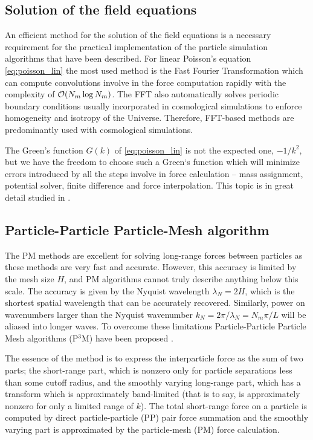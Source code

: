\subsection{Solution of the field equations}
An efficient method for the solution of the field equations is a necessary requirement for the practical implementation of the particle simulation algorithms that have been described. For linear Poisson’s equation \eqref{eq:poisson_lin} the most used method is the Fast Fourier Transformation which can compute convolutions involve in the force computation rapidly with the complexity of $\mathcal{O}(N_m\log N_m)$. The FFT also automatically solves periodic boundary conditions usually incorporated in cosmological simulations to enforce homogeneity and isotropy of the Universe. Therefore, FFT-based methods are predominantly used with cosmological simulations.

The Green's function $G(k)$ of \eqref{eq:poisson_lin} is not the expected one, $-1/k^2$, but we have the freedom to choose such a Green`s function which will minimize errors introduced by all the steps involve in force calculation -- mass assignment, potential solver, finite difference and force interpolation. This topic is in great detail studied in \textcite{Hockney:1988:CSU:62815}.
\subsection{Particle-Particle Particle-Mesh algorithm}
The PM methods are excellent for solving long-range forces between particles as these methods are very fast and accurate. However, this accuracy is limited by the mesh size $H$, and PM algorithms cannot truly describe anything below this scale. The accuracy is given by the Nyquist wavelength $\lambda_N=2H$, which is the shortest spatial wavelength that can be accurately recovered. Similarly, power on wavenumbers larger than the Nyquist wavenumber $k_N=2\pi/\lambda_N=N_m\pi/L$ will be aliased into longer waves. To overcome these limitations Particle-Particle Particle Mesh algorithms (P$^3$M) have been proposed \textcite{hockney_10000_1973}.

The essence of the method is to express the interparticle force as the sum of two parts; the short-range part, which is nonzero only for particle separations less than some cutoff radius, and the smoothly varying long-range part, which has a transform which is approximately band-limited (that is to say, is approximately nonzero for only a limited range of $k$). The total short-range force on a particle is computed by direct particle-particle (PP) pair force summation and the smoothly varying part is approximated by the particle-mesh (PM) force calculation.

